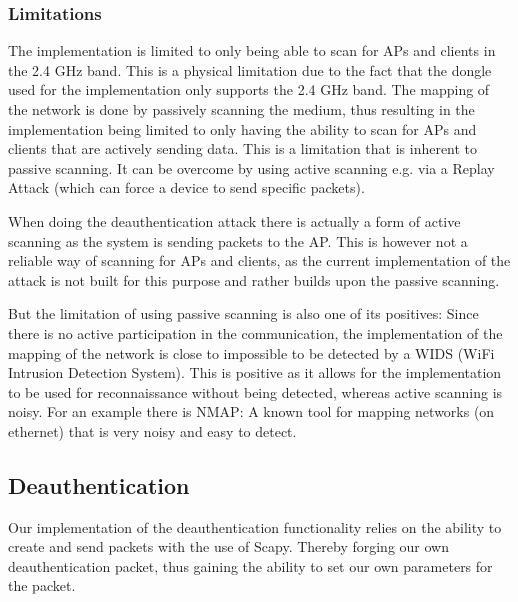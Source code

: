 \subsubsection*{Limitations}
The implementation is limited to only being able to scan for APs and clients in the 2.4 GHz band. This is a physical limitation due to the fact that the dongle used for the implementation only supports the 2.4 GHz band.
The mapping of the network is done by passively scanning the medium, thus resulting in the implementation being limited to only having the ability to scan for APs and clients that are actively sending data. This is a limitation that is inherent to passive scanning. It can be overcome by using active scanning e.g. via a Replay Attack (which can force a device to send specific packets).

When doing the deauthentication attack there is actually a form of active scanning as the system is sending packets to the AP. This is however not a reliable way of scanning for APs and clients, as the current implementation of the attack is not built for this purpose and rather builds upon the passive scanning.

But the limitation of using passive scanning is also one of its positives: Since there is no active participation in the communication, the implementation of the mapping of the network is close to impossible to be detected by a WIDS (WiFi Intrusion Detection System). This is positive as it allows for the implementation to be used for reconnaissance without being detected, whereas active scanning is noisy. For an example there is NMAP: A known tool for mapping networks (on ethernet) that is very noisy and easy to detect.

\newpage
\subsection{Deauthentication}
Our implementation of the deauthentication functionality relies on the ability to create and send packets with the use of Scapy. Thereby forging our own deauthentication packet, thus gaining the ability to set our own parameters for the packet.

